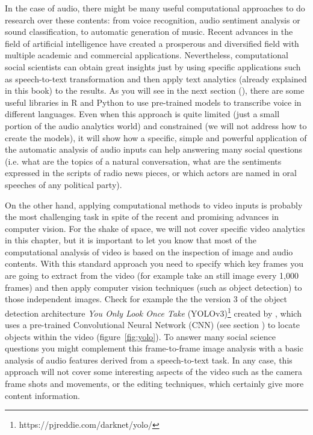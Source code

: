 In the case of audio, there might be many useful computational approaches to do research over these contents: from voice recognition, audio sentiment analysis or sound classification, to automatic generation of music. Recent advances in the field of artificial intelligence have created a prosperous and diversified field with multiple academic and commercial applications. Nevertheless, computational social scientists can obtain great insights just by using specific applications such as speech-to-text transformation and then apply text analytics (already explained in this book) to the results. As you will see in the next section (), there are some useful libraries in R and Python to use pre-trained models to transcribe voice in different languages. Even when this approach is quite limited (just a small portion of the audio analytics world) and constrained (we will not address how to create the models), it will show how a specific, simple and powerful application of the automatic analysis of audio inputs can help answering many social questions (i.e. what are the topics of a natural conversation, what are the sentiments expressed in the scripts of radio news pieces, or which actors are named in oral speeches of any political party).

On the other hand, applying computational methods to video inputs is probably the most challenging task in spite of the recent and promising advances in computer vision. For the shake of space, we will not cover specific video analytics in this chapter, but it is important to let you know that most of the computational analysis of video is based on the inspection of image and audio contents. With this standard approach you need to specify which key frames you are going to extract from the video (for example take an still image every 1,000 frames) and then apply computer vision techniques (such as object detection) to those independent images. Check for example the the version 3 of the object detection architecture \textit{You Only Look Once Take} (YOLOv3)\footnote{https://pjreddie.com/darknet/yolo/} created by \citet{yolov3}, which uses a pre-trained Convolutional Neural Network (CNN) (see section ) to locate objects within the video (figure~\ref{fig:yolo}). To answer many social science questions you might complement this frame-to-frame image analysis with a basic analysis of audio features derived from a speech-to-text task. In any case, this approach will not cover some interesting aspects of the video such as the camera frame shots and movements, or the editing techniques, which certainly give more content information.

